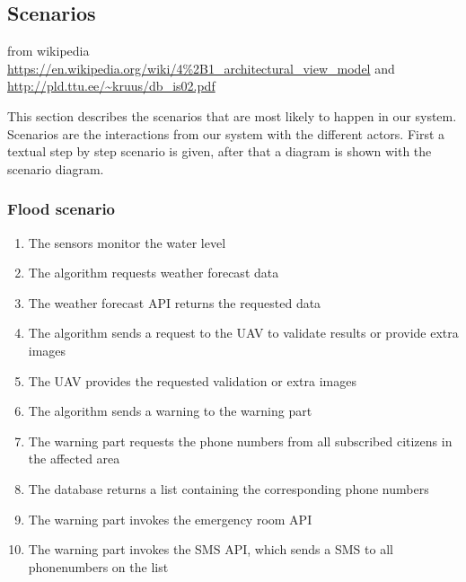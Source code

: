 \subsection{Scenarios}
{from wikipedia\\\url{https://en.wikipedia.org/wiki/4\%2B1_architectural_view_model} and \url{http://pld.ttu.ee/~kruus/db_is02.pdf}}

This section describes the scenarios that are most likely to happen in our system. Scenarios are the interactions from our system with the different actors. First a textual step by step scenario is given, after that a diagram is shown with the scenario diagram.

\subsubsection*{Flood scenario}
\begin{enumerate}
  	\item The sensors monitor the water level
  	\item The algorithm requests weather forecast data
  	\item The weather forecast API returns the requested data
  	\item The algorithm sends a request to the UAV to validate results or provide extra images
  	\item The UAV provides the requested validation or extra images
  	\item The algorithm sends a warning to the warning part
  	\item The warning part requests the phone numbers from all subscribed citizens in the affected area
  	\item The database returns a list containing the corresponding phone numbers
  	\item The warning part invokes the emergency room API
  	\item The warning part invokes the SMS API, which sends a SMS to all phonenumbers on the list
\end{enumerate}

